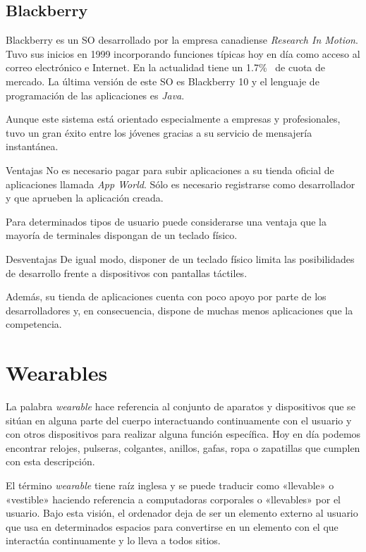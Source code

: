 \subsection{Blackberry}

Blackberry es un \acs{SO} desarrollado por la empresa canadiense \emph{Research In Motion}. Tuvo sus
inicios en 1999 incorporando funciones típicas hoy en día como acceso al correo electrónico e
Internet. En la actualidad tiene un 1.7\%~\cite{Llamas13} de cuota de mercado. La última versión de
este \acs{SO} es Blackberry 10 y el lenguaje de programación de las aplicaciones es \emph{Java}.

Aunque este sistema está orientado especialmente a empresas y profesionales, tuvo un gran éxito
entre los jóvenes gracias a su servicio de mensajería instantánea.

\begin{definitionlist}
  \item[Ventajas] No es necesario pagar para subir aplicaciones a su tienda oficial de aplicaciones
    llamada \emph{App World}. Sólo es necesario registrarse como desarrollador y que aprueben
    la aplicación creada.

    Para determinados tipos de usuario puede considerarse una ventaja que la mayoría de terminales
    dispongan de un teclado físico.

  \item[Desventajas] De igual modo, disponer de un teclado físico limita las posibilidades de
    desarrollo frente a dispositivos con pantallas táctiles.

    Además, su tienda de aplicaciones cuenta con poco apoyo por parte de los desarrolladores y, en
    consecuencia, dispone de muchas menos aplicaciones que la competencia.

\end{definitionlist}

\section{Wearables}

La palabra \emph{wearable} hace referencia al conjunto de aparatos y dispositivos que se sitúan en
alguna parte del cuerpo interactuando continuamente con el usuario y con otros dispositivos para
realizar alguna función específica. Hoy en día podemos encontrar relojes, pulseras, colgantes,
anillos, gafas, ropa o zapatillas que cumplen con esta descripción.

El término \emph{wearable} tiene raíz inglesa y se puede traducir como «llevable» o «vestible»
haciendo referencia a computadoras corporales o «llevables» por el usuario. Bajo esta visión, el
ordenador deja de ser un elemento externo al usuario que usa en determinados espacios para
convertirse en un elemento con el que interactúa continuamente y lo lleva a todos sitios.

